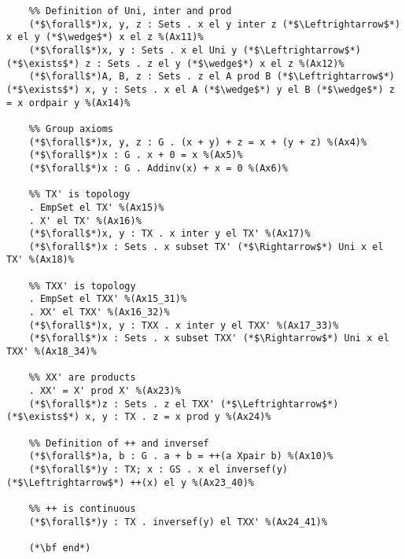 \documentclass[preview]{standalone}
\begin{document}
\begin{lstlisting}
	%% Definition of Uni, inter and prod
	(*$\forall$*)x, y, z : Sets . x el y inter z (*$\Leftrightarrow$*) x el y (*$\wedge$*) x el z %(Ax11)%
	(*$\forall$*)x, y : Sets . x el Uni y (*$\Leftrightarrow$*) (*$\exists$*) z : Sets . z el y (*$\wedge$*) x el z %(Ax12)%
	(*$\forall$*)A, B, z : Sets . z el A prod B (*$\Leftrightarrow$*) (*$\exists$*) x, y : Sets . x el A (*$\wedge$*) y el B (*$\wedge$*) z = x ordpair y %(Ax14)%
	
	%% Group axioms
	(*$\forall$*)x, y, z : G . (x + y) + z = x + (y + z) %(Ax4)%
	(*$\forall$*)x : G . x + 0 = x %(Ax5)%
	(*$\forall$*)x : G . Addinv(x) + x = 0 %(Ax6)%
	
	%% TX' is topology
	. EmpSet el TX' %(Ax15)%
	. X' el TX' %(Ax16)%
	(*$\forall$*)x, y : TX . x inter y el TX' %(Ax17)%
	(*$\forall$*)x : Sets . x subset TX' (*$\Rightarrow$*) Uni x el TX' %(Ax18)%
	
	%% TXX' is topology
	. EmpSet el TXX' %(Ax15_31)%
	. XX' el TXX' %(Ax16_32)%
	(*$\forall$*)x, y : TXX . x inter y el TXX' %(Ax17_33)%
	(*$\forall$*)x : Sets . x subset TXX' (*$\Rightarrow$*) Uni x el TXX' %(Ax18_34)%
	
	%% XX' are products
	. XX' = X' prod X' %(Ax23)%
	(*$\forall$*)z : Sets . z el TXX' (*$\Leftrightarrow$*) (*$\exists$*) x, y : TX . z = x prod y %(Ax24)%
	
	%% Definition of ++ and inversef
	(*$\forall$*)a, b : G . a + b = ++(a Xpair b) %(Ax10)%
	(*$\forall$*)y : TX; x : GS . x el inversef(y) (*$\Leftrightarrow$*) ++(x) el y %(Ax23_40)%
	
	%% ++ is continuous
	(*$\forall$*)y : TX . inversef(y) el TXX' %(Ax24_41)%
	
	(*\bf end*)
\end{lstlisting}
\end{document}
